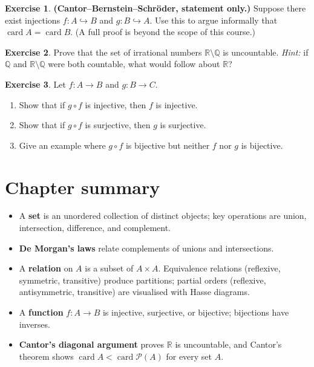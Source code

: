 \documentclass[12pt,a4paper,openany]{book}
\theoremstyle{definition}
\newtheorem{exercise}{Exercise}[chapter]
\theoremstyle{plain}
\theoremstyle{remark}
\newcommand{\Q}{\mathbb{Q}}
\newcommand{\R}{\mathbb{R}}
\newcommand{\powerset}{\mathcal{P}}
\DeclareMathOperator{\card}{card}
\begin{document}
\begin{exercise}\label{exer:cantor-bernstein}
\textbf{(Cantor--Bernstein--Schr\"oder, statement only.)}
Suppose there exist injections $f\colon A \hookrightarrow B$ and
$g\colon B \hookrightarrow A$. Use this to argue informally that
$\card{A} = \card{B}$. (A full proof is beyond the scope of this course.)
\end{exercise}

\begin{exercise}\label{exer:uncountable-irrationals}
Prove that the set of irrational numbers $\R \setminus \Q$ is uncountable.
\emph{Hint:} if $\Q$ and $\R \setminus \Q$ were both countable, what would
follow about $\R$?
\end{exercise}

\begin{exercise}\label{exer:composition-cancel}
Let $f\colon A \to B$ and $g\colon B \to C$.
\begin{enumerate}[label=(\alph*)]
  \item Show that if $g \circ f$ is injective, then $f$ is injective.
  \item Show that if $g \circ f$ is surjective, then $g$ is surjective.
  \item Give an example where $g \circ f$ is bijective but neither $f$ nor
        $g$ is bijective.
\end{enumerate}
\end{exercise}

\section{Chapter summary}
\label{sec:ch3-summary}

\begin{itemize}[nosep]
  \item A \textbf{set} is an unordered collection of distinct
    objects; key operations are union, intersection, difference, and complement.
  \item \textbf{De Morgan's laws} relate complements
    of unions and intersections.
  \item A \textbf{relation} on $A$ is a subset of $A \times A$.
    Equivalence relations (reflexive, symmetric, transitive) produce partitions;
    partial orders (reflexive, antisymmetric, transitive) are visualised with
    Hasse diagrams.
  \item A \textbf{function} $f\colon A \to B$ is injective,
    surjective, or bijective; bijections have inverses.
  \item \textbf{Cantor's diagonal argument}
    proves $\R$ is uncountable, and Cantor's theorem shows
    $\card{A} < \card{\powerset(A)}$ for every set $A$.
\end{itemize}
\end{document}
